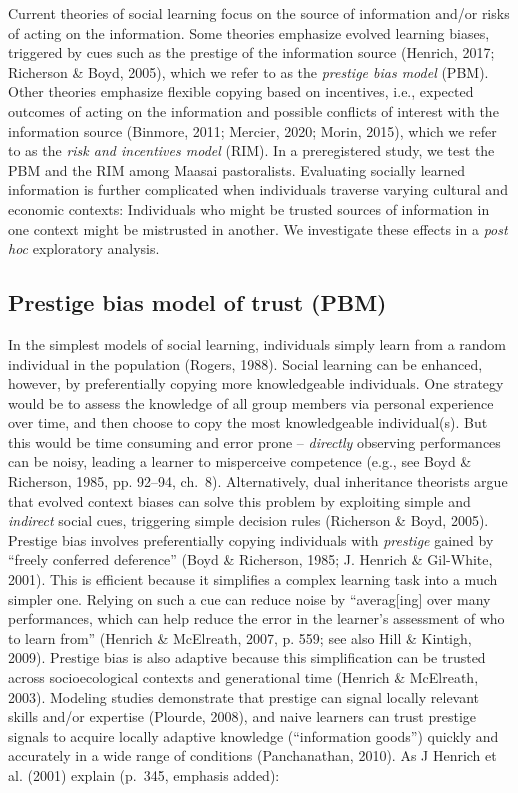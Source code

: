 \documentclass[
  11pt,
]{article}
\begin{document}
Current theories of social learning focus on the source of information
and/or risks of acting on the information. Some theories emphasize
evolved learning biases, triggered by cues such as the prestige of the
information source (Henrich, 2017; Richerson \& Boyd, 2005), which we
refer to as the \emph{prestige bias model} (PBM). Other theories
emphasize flexible copying based on incentives, i.e., expected outcomes
of acting on the information and possible conflicts of interest with the
information source (Binmore, 2011; Mercier, 2020; Morin, 2015), which we
refer to as the \emph{risk and incentives model} (RIM). In a
preregistered study, we test the PBM and the RIM among Maasai
pastoralists. Evaluating socially learned information is further
complicated when individuals traverse varying cultural and economic
contexts: Individuals who might be trusted sources of information in one
context might be mistrusted in another. We investigate these effects in
a \emph{post hoc} exploratory analysis.

\hypertarget{prestige-bias-model-of-trust-pbm}{%
\subsection{Prestige bias model of trust
(PBM)}\label{prestige-bias-model-of-trust-pbm}}

In the simplest models of social learning, individuals simply learn from
a random individual in the population (Rogers, 1988). Social learning
can be enhanced, however, by preferentially copying more knowledgeable
individuals. One strategy would be to assess the knowledge of all group
members via personal experience over time, and then choose to copy the
most knowledgeable individual(s). But this would be time consuming and
error prone -- \emph{directly} observing performances can be noisy,
leading a learner to misperceive competence (e.g., see Boyd \&
Richerson, 1985, pp. 92--94, ch.~8). Alternatively, dual inheritance
theorists argue that evolved context biases can solve this problem by
exploiting simple and \emph{indirect} social cues, triggering simple
decision rules (Richerson \& Boyd, 2005). Prestige bias involves
preferentially copying individuals with \emph{prestige} gained by
``freely conferred deference'' (Boyd \& Richerson, 1985; J. Henrich \&
Gil-White, 2001). This is efficient because it simplifies a complex
learning task into a much simpler one. Relying on such a cue can reduce
noise by ``averag{[}ing{]} over many performances, which can help reduce
the error in the learner's assessment of who to learn from'' (Henrich \&
McElreath, 2007, p. 559; see also Hill \& Kintigh, 2009). Prestige bias
is also adaptive because this simplification can be trusted across
socioecological contexts and generational time (Henrich \& McElreath,
2003). Modeling studies demonstrate that prestige can signal locally
relevant skills and/or expertise (Plourde, 2008), and naive learners can
trust prestige signals to acquire locally adaptive knowledge
(``information goods'') quickly and accurately in a wide range of
conditions (Panchanathan, 2010). As J Henrich et al. (2001) explain
(p.~345, emphasis added):
\end{document}
